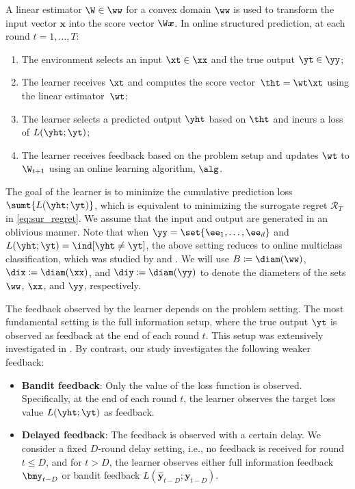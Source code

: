 A linear estimator $\W\in\ww$ for a convex domain $\ww$ is used to transform the input vector $\bm{x}$ into the score vector $\W\bm{x}$.  
In online structured prediction, at each round $t=1,\dots,T$:
\begin{enumerate}%
    \item The environment selects an input $\xt\in\xx$ and the true output $\yt\in\yy$; 
    \item The learner receives $\xt$ and computes the score vector~$\tht=\wt\xt$ using the linear estimator~$\wt$;
    \item The learner selects a predicted output $\yht$ based on $\tht$ and incurs a loss of $L(\yht;\yt)$;
    \item The learner receives feedback based on the problem setup and updates $\wt$ to $\W_{t+1}$ using an online learning algorithm, $\alg$.
\end{enumerate}
The goal of the learner is to minimize the cumulative prediction loss $\sumt{L(\yht;\yt)}$, which is equivalent to minimizing the surrogate regret $\mathcal{R}_T$ in \eqref{eq:sur_regret}.  
We assume that the input and output are generated in an oblivious manner.  
Note that when $\yy = \set{\bm{\ee}_1, \dots, \bm{\ee}_d}$ and $L(\yht; \yt) = \ind[\yht \neq \yt]$, the above setting reduces to online multiclass classification, which was studied by  and .
We will use $B\coloneqq\diam(\ww)$, $\dix\coloneqq\diam(\xx)$, and $\diy\coloneqq\diam(\yy)$ to denote the diameters of the sets $\ww$, $\xx$, and $\yy$, respectively.


The feedback observed by the learner depends on the problem setting.  
The most fundamental setting is the full information setup, where the true output $\yt$ is observed as feedback at the end of each round $t$. 
This setup was extensively investigated in \citet{pmlr-v247-sakaue24a}.  
By contrast, our study investigates the following weaker feedback:
\begin{itemize}%
    \item \textbf{Bandit feedback}: Only the value of the loss function is observed. 
    Specifically, at the end of each round $t$, the learner observes the target loss value $L(\yht;\yt)$ as feedback.  
    \item \textbf{Delayed feedback}: The feedback is observed with a certain delay. 
    We consider a fixed $D$-round delay setting, i.e., no feedback is received for round $t\leq D$,  
    and for $t>D$, the learner observes either full information feedback $\bmy_{t-D}$ or bandit feedback $L(\hat{\bm{y}}_{t-D}; \bm{y}_{t-D})$.  
\end{itemize}


